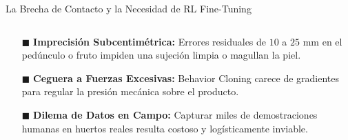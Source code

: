 \begin{frame}{La Brecha de Contacto y la Necesidad de RL Fine-Tuning}
  \vspace{0.8mm}
  \begin{columns}[T, onlytextwidth]
    \begin{column}{0.485\textwidth}
      \begin{tcolorbox}[
        enhanced,
        colback=AlertRedLight,
        colframe=AlertRed,
        arc=\CardArc,
        boxrule=\CardRule,
        height=\CardHeightDouble,
        title={\CardTitleFont Límites de Behavior Cloning Puro},
        colbacktitle=AlertRed,
        coltitle=WhiteBg,
        top=1.2mm, bottom=1.2mm, left=1.8mm, right=1.8mm
      ]
        {\BodyFont
        \begin{itemize}\setlength{\itemsep}{1.8pt}
          \item[\textcolor{AlertRed}{$\blacksquare$}] \textbf{Imprecisión Subcentimétrica:} Errores residuales de $10$ a $25\text{ mm}$ en el pedúnculo o fruto impiden una sujeción limpia o magullan la piel.
          \item[\textcolor{AlertRed}{$\blacksquare$}] \textbf{Ceguera a Fuerzas Excesivas:} Behavior Cloning carece de gradientes para regular la presión mecánica sobre el producto.
          \item[\textcolor{AlertRed}{$\blacksquare$}] \textbf{Dilema de Datos en Campo:} Capturar miles de demostraciones humanas en huertos reales resulta costoso y logísticamente inviable.
        \end{itemize}}
      \end{tcolorbox}
    \end{column}


\end{columns}
\end{frame}
